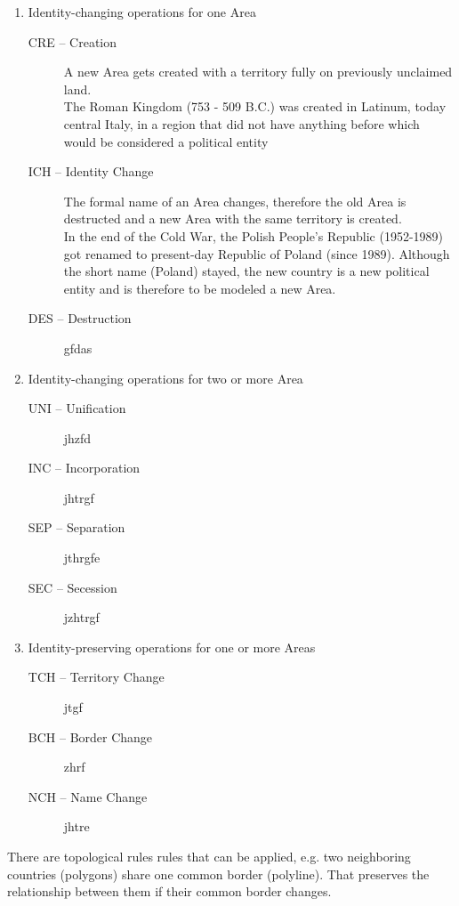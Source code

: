 \begin{enumerate}
  \item Identity-changing operations for one Area
  \begin{description}
    \item[CRE -- Creation]
    A new Area gets created with a territory fully on previously unclaimed land. \\
    The Roman Kingdom (753 - 509 B.C.) was created in Latinum, today central Italy, in a region that did not have anything before which would be considered a political entity
    \item[ICH -- Identity Change]
    The formal name of an Area changes, therefore the old Area is destructed and a new Area with the same territory is created. \\
    In the end of the Cold War, the Polish People's Republic (1952-1989) got renamed to present-day Republic of Poland (since 1989). Although the short name (Poland) stayed, the new country is a new political entity and is therefore to be modeled a new Area.
    \item[DES -- Destruction]
    gfdas
  \end{description}
  \item Identity-changing operations for two or more Area
  \begin{description}
    \item[UNI -- Unification]
    jhzfd
    \item[INC -- Incorporation]
    jhtrgf
    \item[SEP -- Separation]
    jthrgfe
    \item[SEC -- Secession]
    jzhtrgf
  \end{description}
  \item Identity-preserving operations for one or more Areas
  \begin{description}
    \item[TCH -- Territory Change]
    jtgf
    \item[BCH -- Border Change]
    zhrf
    \item[NCH -- Name Change]
    jhtre
  \end{description}
\end{enumerate}




There are topological rules rules that can be applied, e.g. two neighboring countries (polygons) share one common border (polyline). That preserves the relationship between them if their common border changes.


